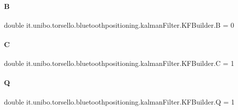 \paragraph{\texorpdfstring{B}{B}}
{\footnotesize\ttfamily double it.\+unibo.\+torsello.\+bluetoothpositioning.\+kalman\+Filter.\+K\+F\+Builder.\+B = 0\hspace{0.3cm}{\ttfamily [private]}}

\hypertarget{classit_1_1unibo_1_1torsello_1_1bluetoothpositioning_1_1kalmanFilter_1_1KFBuilder_aa35dc81cfdbcef5286f8c812f1849341_aa35dc81cfdbcef5286f8c812f1849341}{}\label{classit_1_1unibo_1_1torsello_1_1bluetoothpositioning_1_1kalmanFilter_1_1KFBuilder_aa35dc81cfdbcef5286f8c812f1849341_aa35dc81cfdbcef5286f8c812f1849341} 
\paragraph{\texorpdfstring{C}{C}}
{\footnotesize\ttfamily double it.\+unibo.\+torsello.\+bluetoothpositioning.\+kalman\+Filter.\+K\+F\+Builder.\+C = 1\hspace{0.3cm}{\ttfamily [private]}}

\hypertarget{classit_1_1unibo_1_1torsello_1_1bluetoothpositioning_1_1kalmanFilter_1_1KFBuilder_ad332fe3c9e6ec20badaa4b8738fe264b_ad332fe3c9e6ec20badaa4b8738fe264b}{}\label{classit_1_1unibo_1_1torsello_1_1bluetoothpositioning_1_1kalmanFilter_1_1KFBuilder_ad332fe3c9e6ec20badaa4b8738fe264b_ad332fe3c9e6ec20badaa4b8738fe264b} 
\paragraph{\texorpdfstring{Q}{Q}}
{\footnotesize\ttfamily double it.\+unibo.\+torsello.\+bluetoothpositioning.\+kalman\+Filter.\+K\+F\+Builder.\+Q = 1\hspace{0.3cm}{\ttfamily [private]}}


